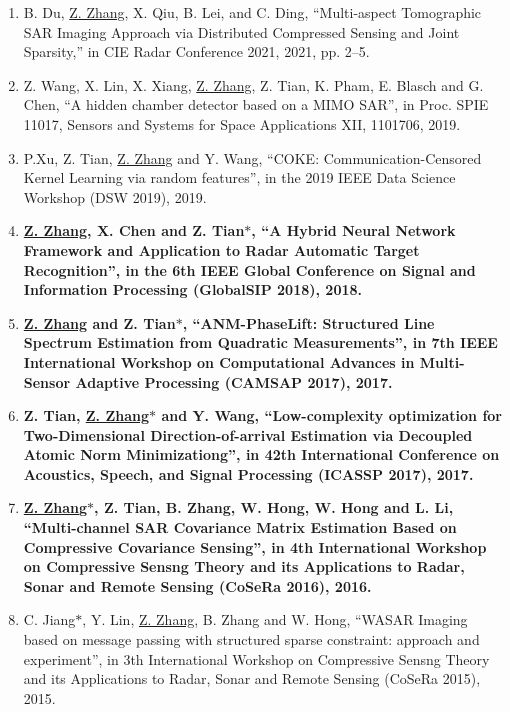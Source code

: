 \documentclass[paper=a4,fontsize=11pt]{scrartcl}
\begin{document}
\begin{enumerate}
	\item B. Du, \underline{Z. Zhang}, X. Qiu, B. Lei, and C. Ding, ``Multi-aspect Tomographic SAR Imaging Approach via Distributed Compressed Sensing and Joint Sparsity,'' in CIE Radar Conference 2021, 2021, pp. 2–5.
	
	\item {Z. Wang, X. Lin, X. Xiang, \underline{Z. Zhang}, Z. Tian, K. Pham, E. Blasch and G. Chen, ``A hidden chamber detector based on a MIMO SAR'', in Proc. SPIE 11017, Sensors and Systems for Space Applications XII, 1101706, 2019.}	
	
	\item {P.Xu, Z. Tian, \underline{Z. Zhang} and Y. Wang, ``COKE: Communication-Censored Kernel Learning via random features'', in the 2019 IEEE Data Science Workshop (DSW 2019), 2019.}	
	
	\item \textbf{\underline{Z. Zhang}, X. Chen and Z. Tian$\ast$, ``A Hybrid Neural Network Framework and Application to Radar Automatic Target Recognition'', in the 6th IEEE Global Conference on Signal and Information Processing (GlobalSIP 2018), 2018.}
	
	\item \textbf{\underline{Z. Zhang} and Z. Tian$\ast$, ``ANM-PhaseLift: Structured Line Spectrum Estimation from Quadratic Measurements'', in 7th IEEE International Workshop on Computational Advances in Multi-Sensor Adaptive Processing (CAMSAP 2017), 2017.}
	
	\item \textbf{Z. Tian, \underline{Z. Zhang$\ast$} and Y. Wang, ``Low-complexity optimization for Two-Dimensional Direction-of-arrival Estimation via Decoupled Atomic Norm Minimizationg'', in 42th International Conference on Acoustics, Speech, and Signal Processing (ICASSP 2017), 2017.}
	
	\item \textbf{\underline{Z. Zhang$\ast$}, Z. Tian, B. Zhang, W. Hong, W. Hong and L. Li, ``Multi-channel SAR Covariance Matrix Estimation Based on Compressive Covariance Sensing'', in 4th International Workshop on Compressive Sensng Theory and its Applications to Radar, Sonar and Remote Sensing (CoSeRa 2016), 2016.}
	
	\item C. Jiang$\ast$, Y. Lin, \underline{Z. Zhang}, B. Zhang and W. Hong, ``WASAR Imaging based on message passing with structured sparse constraint: approach and experiment'', in 3th International Workshop on Compressive Sensng Theory and its Applications to Radar, Sonar and Remote Sensing (CoSeRa 2015), 2015.
	

\end{enumerate}
\end{document}
